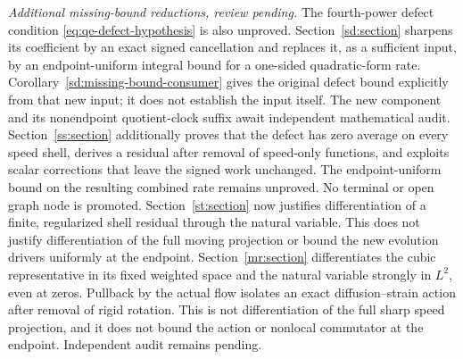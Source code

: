 \documentclass[11pt]{article}
\theoremstyle{definition}
\theoremstyle{plain}
\begin{document}
\emph{Additional missing-bound reductions, review pending.}
The fourth-power defect condition \eqref{eq:qe-defect-hypothesis} is also
unproved. Section~\ref{sd:section} sharpens its coefficient by an exact
signed cancellation and replaces it, as a sufficient input, by an
endpoint-uniform integral bound for a one-sided quadratic-form rate.
Corollary~\ref{sd:missing-bound-consumer} gives the original defect bound
explicitly from that new input; it does not establish the input itself.
The new component and its nonendpoint quotient-clock suffix await
independent mathematical audit. Section~\ref{ss:section} additionally
proves that the defect has zero average on every speed shell, derives
a residual after removal of speed-only functions, and exploits scalar
corrections that leave the signed work unchanged. The endpoint-uniform
bound on the resulting combined rate remains unproved.
No terminal or open graph node is promoted.
Section~\ref{st:section} now justifies differentiation of a finite,
regularized shell residual through the natural variable. This does not
justify differentiation of the full moving projection or bound the
new evolution drivers uniformly at the endpoint.
Section~\ref{mr:section} differentiates the cubic representative in its
fixed weighted space and the natural variable strongly in $L^2$, even at
zeros. Pullback by the actual flow isolates an exact diffusion--strain
action after removal of rigid rotation. This is not differentiation of
the full sharp speed projection, and it does not bound the action or
nonlocal commutator at the endpoint. Independent audit remains pending.














\end{document}
